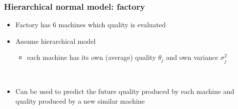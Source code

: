 \documentclass[10pt]{beamer}
\begin{document}
\begin{frame}

\frametitle{Hierarchical normal model: factory}

  \begin{itemize}
  \item Factory has 6 machines which quality is evaluated
  \item Assume hierarchical model
    \begin{itemize}
    \item each machine has its own (average) quality $\theta_j$ and
      {\color{uured} own variance} $\sigma_j^2$
    \end{itemize}
\hspace{-1cm}~\begin{minipage}[b]{4cm}
      \begin{xy}
      \end{xy}
    \end{minipage}
  \item Can be used to predict the future quality produced by each machine and quality produced by a new similar machine
  \end{itemize}
\end{frame}
\end{document}
